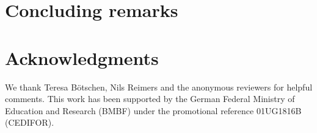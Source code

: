 \documentclass[11pt,a4paper]{article}
\begin{document}
\section{Concluding remarks}\label{sec:conclusion}


\section*{Acknowledgments}
We thank Teresa B\"otschen, Nils Reimers and the anonymous reviewers for helpful comments.
This work has been supported by the
German Federal Ministry of Education and Research
(BMBF) under the promotional reference
01UG1816B (CEDIFOR).




\appendix

\end{document}

